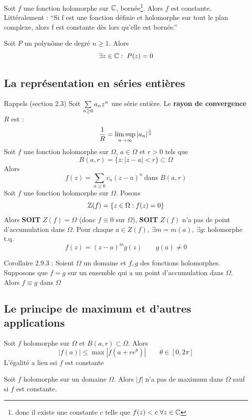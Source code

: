 \documentclass[12pt,a4paper]{article}
\begin{document}
\begin{boite}
     Soit $f$ une fonction holomorphe sur {$\mathbb{C}$}, bornée\footnote{donc il existe une constante $c$ telle que $f(z) < c\ \forall z \in \mathbb{C}$}. Alors $f$ est constante. Littéralement :
    ``Si f est une fonction définie et holomorphe sur tout le plan complexe, alors f est constante dès lors qu'elle est bornée.''
\end{boite}
    
 Soit $P$ un polynôme de degré $n \geq 1$. Alors 
\[\exists z \in \mathbb{C} :\ P(z) = 0\]

\subsection{La représentation en séries entières}
Rappels (section 2.3) Soit $\sum\limits_{n\geq 0}^{} a_nz^n$ une série entière. Le \textbf{rayon de convergence} $R$ est :
\[\frac{1}{R} = \limsup_{n \to \infty} |a_n|^\frac{1}{n}\]
 Soit $f$ une fonction holomorphe sur $\Omega$, $a \in \Omega$ et $r > 0$ tels que 
\[B(a,r) =\{z : |z-a| < r\} \subset \Omega\]
Alors 
\[f(z) = \sum_{n\geq 0} c_n(z-a)^n \ \text{dans } B(a,r)\]
 Soit $f$ une fonction holomorphe sur $\Omega$. Posons 
\[\mathbb{Z}(f) = \{z \in \Omega : f(z) = 0\}\]
Alors \textbf{SOIT} $Z(f) = \Omega$ (donc $f \equiv 0$ sur $\Omega$), \textbf{SOIT} $Z(f)$ n'a pas de point d'accumulation dans $\Omega$. Pour chaque $a\in Z(f),\ \exists m = m(a),\ \exists g$: holomorphe t.q. \[f(z) = (z-a)^m g(z)\qquad g(a) \neq 0\]

Corollaire 2.9.3 : Soient $\Omega$ un domaine et $f,g$ des fonctions holomorphes. Supposons que $f=g$ sur un ensemble qui a un point d'accumulation dans $\Omega$. Alors $f \equiv g$ dans $\Omega$
\subsection{Le principe de maximum et d'autres applications}
\begin{boite}
     Soit $f$ holomorphe sur $\Omega$ et $B(a,r) \subset \Omega$. Alors 
\begin{equation}
    |f(a)| \leq \max |f(a+re^\theta)|\qquad \theta \in [0,2\pi]
\end{equation}
L'égalité a lieu ssi $f$ est constante
\end{boite}
 Soit $f$ holomorphe sur un domaine $\Omega$. Alors $|f|$ n'a pas de maximum dans $\Omega$ sauf si $f$ est constante.
\end{document}
